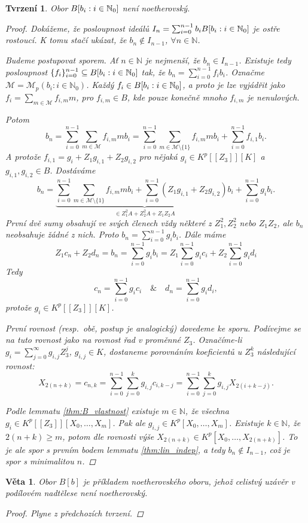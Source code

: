 \documentclass[11pt,a4paper]{article}
\newcommand\m[1]{\mathbb { #1 }} %
\newcommand\p[1]{\mathcal{ #1 }} %
\newcommand\N{\m N}
\newcommand*{\mld}[1]{\[#1\]} %
\newcounter{numb}
\theoremstyle{definition}
\theoremstyle{plain}
\newtheorem{veta}[numb]{Věta}
\newtheorem{tvrzeni}[numb]{Tvrzení}
\begin{document}
\begin{tvrzeni}
	Obor $\Ball$ není noetherovský.
	
	\begin{proof}
		\newcommand*{\I}{_{i = 0}^{n - 1}}

		Dokážeme, že posloupnost ideálů $I_n = \sum\I b_i \Ball$ je ostře rostoucí. K tomu stačí ukázat, že $b_n \notin I_{n - 1}$, $\forall n \in \N$.

		Budeme postupovat sporem. Ať $n \in \N$ je nejmenší, že $b_n \in I_{n - 1}$. Existuje tedy posloupnost $\{f_i\}\I \subseteq \Ball$ tak, že $b_n = \sum\I f_i b_i$. Označme $\p M = \p M_p(b_i: i \in \N_0)$. Každý $f_i \in \Ball$, a proto je lze vyjádřit jako $f_i = \sum_{m \in \p M} f_{i, m} m$, pro $f_{i, m} \in B$, kde pouze konečně mnoho $f_{i, m}$ je nenulových.

		Potom
		\mld{
			b_n = \sum\I \sum_{m \in \p M} f_{i, m} m b_i = \sum\I \sum_{m \in \p M \setminus \{1\}} f_{i, m} m b_i + \sum\I f_{i, 1} b_i.
		}
		A protože $f_{i, 1} = g_i + Z_1 g_{i, 1} + Z_2 g_{i, 2}$ pro nějaká $g_i \in K^p[[Z_3]][K]$ a $g_{i, 1}, g_{i, 2} \in B$. Dostáváme
		\mld{
			b_n = \underbrace{\sum\I \sum_{m \in \p M \setminus \{1\}} f_{i, m} m b_i + \sum\I \left(Z_1 g_{i, 1} + Z_2 g_{i, 2}\right)b_i}_{\in Z_1^2 A + Z_2^2 A + Z_1 Z_2 A} + \sum\I g_i b_i.
		}
		První dvě sumy obsahují ve svých členech vždy některé z $Z_1^2, Z_2^2$ nebo
		$Z_1 Z_2$, ale $b_n$ neobsahuje žádné z nich. Proto $b_n = \sum\I g_i b_i$. Dále máme
		\mld{
			Z_1 c_n + Z_2 d_n = b_n = \sum\I g_i b_i = Z_1 \sum\I g_i c_i + Z_2 \sum\I g_i d_i
		}
		Tedy
		\mld{
			c_n = \sum\I g_i c_i \quad \& \quad d_n = \sum\I g_i d_i,
		}
		protože $g_i \in K^p[[Z_3]][K]$.

		První rovnost (resp.\ obě, postup je analogický) dovedeme ke sporu. Podívejme se na tuto rovnost jako na rovnost řad v proměnné $Z_3$. Označíme-li $g_i = \sum_{j = 0}^\infty g_{i, j} Z_3^j$, $g_{i, j} \in K$, dostaneme porovnáním koeficientů u $Z_3^k$ následující rovnost:
		\mld{
			X_{2(n + k)} = c_{n, k} = \sum\I \sum_{j = 0}^k g_{i, j} c_{i, k - j} = \sum\I \sum_{j = 0}^k g_{i, j} X_{2(i + k - j)}.
		}
		
		Podle lemmatu \ref{thm:B_vlastnost} existuje $m \in \N$, že všechna $g_i \in K^p[[Z_3]][X_0,\dots, X_m]$. Pak ale $g_{i, j} \in K^p[X_0,\dots, X_m]$. Existuje $k \in \N$, že $2(n + k) \geq m$, potom dle rovnosti výše $X_{2(n + k)} \in K^p[X_0,\dots, X_{2(n + k)}]$. To je ale spor s prvním bodem lemmatu \ref{thm:lin_indep}, a tedy $b_n \not\in I_{n-1}$, což je spor s minimalitou $n$.
	\end{proof}
\end{tvrzeni}

\begin{veta}
	Obor $B[b]$ je příkladem noetherovského oboru, jehož celistvý uzávěr v podílovém nadtělese není noetherovský.
	
	\begin{proof}
		Plyne z předchozích tvrzení.
	\end{proof}
\end{veta}
\end{document}
